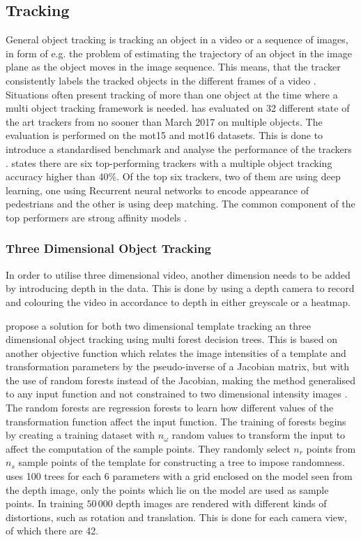 \subsection{Tracking}
General object tracking is tracking an object in a video or a sequence of images, in form of e.g. the problem of estimating the trajectory of an object in the image plane as the object moves in the image sequence. This means, that the tracker consistently labels the tracked objects in the different frames of a video \citep{Yilmaz2006}. Situations often present tracking of more than one object at the time where a multi object tracking framework is needed. \cite{Leal-Taixe2017} has evaluated on 32 different state of the art trackers from no sooner than March 2017 on multiple objects. The evaluation is performed on the \gls{mot}15 and \gls{mot}16 datasets. This is done to introduce a standardised benchmark and analyse the performance of the trackers \citep{Leal-Taixe2017}. \cite{Leal-Taixe2017} states there are six top-performing trackers with a multiple object tracking accuracy higher than 40\%. Of the top six trackers, two of them are using deep learning, one using Recurrent neural networks to encode appearance of pedestrians and the other is using deep matching. The common component of the top performers are strong affinity models \citep{Leal-Taixe2017}.

\subsubsection{Three Dimensional Object Tracking}
In order to utilise three dimensional video, another dimension needs to be added by introducing depth in the data. This is done by using a depth camera to record and colouring the video in accordance to depth in either greyscale or a heatmap.

\cite{Tan2014} propose a solution for both two dimensional template tracking an three dimensional object tracking using multi forest decision trees. This is based on another objective function which relates the image intensities of a template and transformation parameters by the pseudo-inverse of a Jacobian matrix, but with the use of random forests instead of the Jacobian, making the method generalised to any input function and not constrained to two dimensional intensity images \citep{Tan2014}. The random forests are regression forests to learn how different values of the transformation function affect the input function. The training of forests begins by creating a training dataset with $n_\omega$ random values to transform the input to affect the computation of the sample points. They randomly select $n_r$ points from $n_s$ sample points of the template for constructing a tree to impose randomness. \cite{Tan2014} uses 100 trees for each 6 parameters with a grid enclosed on the model seen from the depth image, only the points which lie on the model are used as sample points. In training $50\,000$ depth images are rendered with different kinds of distortions, such as rotation and translation. This is done for each camera view, of which there are 42.


